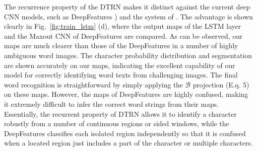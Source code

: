\documentclass[letterpaper]{article}
\begin{document}
The recurrence property of the DTRN makes it distinct against the current deep CNN models, such as DeepFeatures \cite{Jaderberg2014}) and the system of \cite{Wang2012}. The advantage is shown clearly in Fig.~\ref{fig:train_lstm} (d), where the output maps of the LSTM layer and the Maxout CNN of DeepFeatures are compared. As can be observed, our maps are much clearer than those of the DeepFeatures in a number of highly ambiguous word images.
The character probability distribution and segmentation are shown accurately on our maps, indicating the excellent capability of our model for correctly identifying word texts from challenging images. The final word recognition is straightforward by simply applying the $\mathcal{B}$ projection (E.q. 5) on these maps.
However, the maps of DeepFeatures are highly confused, making it extremely difficult to infer the correct word strings from their maps.
Essentially, the recurrent property of DTRN allows it to identify a character robustly from a number of continuous regions or sided windows, while the DeepFeatures classifies each isolated region independently so that it is confused when a located region just includes a part of the character or multiple characters.
\end{document}
